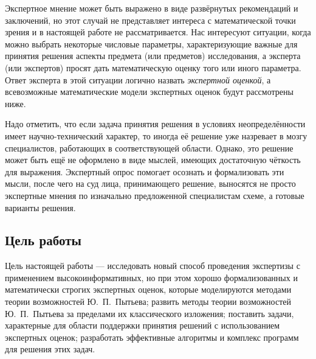 Экспертное мнение может быть выражено в виде развёрнутых рекомендаций и заключений, но этот случай не представляет интереса с математической точки зрения и в настоящей работе не рассматривается. Нас интересуют ситуации, когда можно выбрать некоторые числовые параметры, характеризующие важные для принятия решения аспекты предмета (или предметов) исследования, а эксперта (или экспертов) просят дать математическую оценку того или иного параметра. Ответ эксперта в этой ситуации логично назвать {\sl экспертной оценкой}, а всевозможные математические модели экспертных оценок будут рассмотрены ниже.  
 
Надо отметить, что если задача принятия решения в условиях неопределённости имеет научно-технический характер, то иногда её решение уже назревает в мозгу специалистов, работающих в соответствующей области. Однако, это решение может быть ещё не оформлено в виде мыслей, имеющих достаточную чёткость для выражения. Экспертный опрос помогает осознать и формализовать эти мысли, после чего на суд лица, принимающего решение, выносятся не просто экспертные мнения по изначально предложенной специалистам схеме, а готовые варианты решения. 

\subsection{Цель работы}
Цель настоящей работы --- исследовать новый способ проведения экспертизы с применением высокоинформативных, но при этом хорошо формализованных и математически строгих экспертных оценок, которые моделируются методами теории возможностей Ю.~П.~Пытьева; развить методы теории возможностей Ю.~П.~Пытьева за пределами их классического изложения; поставить задачи, характерные для области поддержки принятия решений с использованием экспертных оценок; разработать эффективные алгоритмы и комплекс программ для решения этих задач. 


